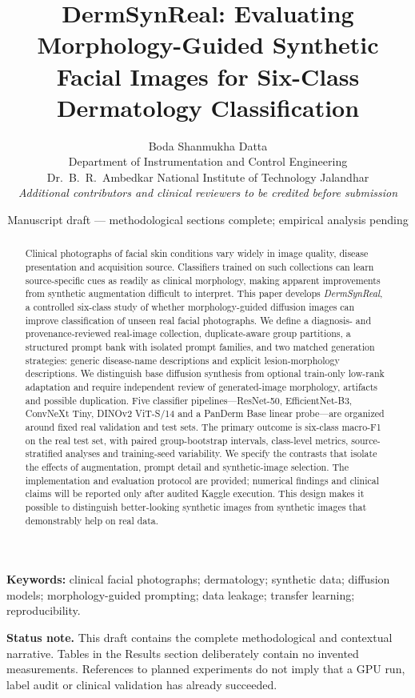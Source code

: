 \documentclass[11pt,a4paper]{article}
\title{\bfseries DermSynReal: Evaluating Morphology-Guided Synthetic Facial Images for Six-Class Dermatology Classification}
\author{Boda Shanmukha Datta\\
\small Department of Instrumentation and Control Engineering\\
\small Dr.\ B.\ R.\ Ambedkar National Institute of Technology Jalandhar\\
\small \textit{Additional contributors and clinical reviewers to be credited before submission}}
\date{\small Manuscript draft --- methodological sections complete; empirical analysis pending}
\begin{document}
\maketitle
\begin{abstract}
Clinical photographs of facial skin conditions vary widely in image quality, disease presentation and acquisition source. Classifiers trained on such collections can learn source-specific cues as readily as clinical morphology, making apparent improvements from synthetic augmentation difficult to interpret. This paper develops \emph{DermSynReal}, a controlled six-class study of whether morphology-guided diffusion images can improve classification of unseen real facial photographs. We define a diagnosis- and provenance-reviewed real-image collection, duplicate-aware group partitions, a structured prompt bank with isolated prompt families, and two matched generation strategies: generic disease-name descriptions and explicit lesion-morphology descriptions. We distinguish base diffusion synthesis from optional train-only low-rank adaptation and require independent review of generated-image morphology, artifacts and possible duplication. Five classifier pipelines---ResNet-50, EfficientNet-B3, ConvNeXt Tiny, DINOv2 ViT-S/14 and a PanDerm Base linear probe---are organized around fixed real validation and test sets. The primary outcome is six-class macro-F1 on the real test set, with paired group-bootstrap intervals, class-level metrics, source-stratified analyses and training-seed variability. We specify the contrasts that isolate the effects of augmentation, prompt detail and synthetic-image selection. The implementation and evaluation protocol are provided; numerical findings and clinical claims will be reported only after audited Kaggle execution. This design makes it possible to distinguish better-looking synthetic images from synthetic images that demonstrably help on real data.
\end{abstract}
\noindent\textbf{Keywords:} clinical facial photographs; dermatology; synthetic data; diffusion models; morphology-guided prompting; data leakage; transfer learning; reproducibility.
\par\medskip
\noindent\textbf{Status note.} This draft contains the complete methodological and contextual narrative. Tables in the Results section deliberately contain no invented measurements. References to planned experiments do not imply that a GPU run, label audit or clinical validation has already succeeded.











\end{document}
